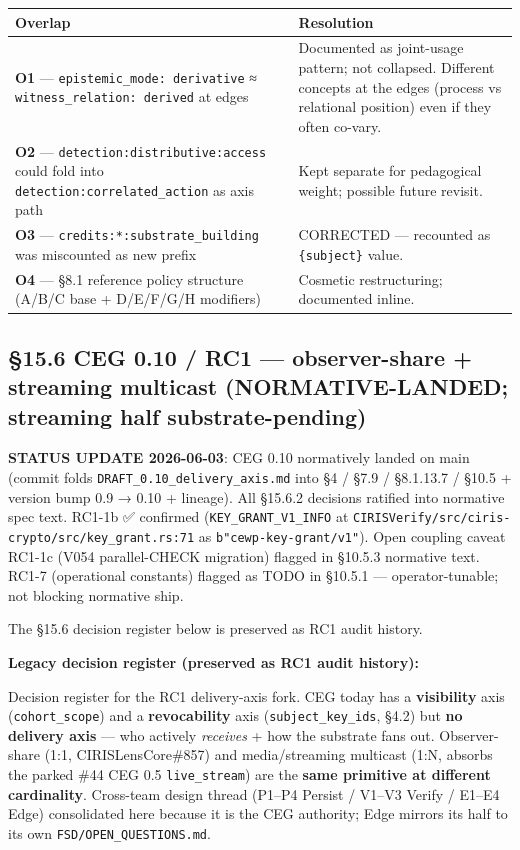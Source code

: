 \documentclass[10pt]{article}
\begin{document}
{\footnotesize
\begin{longtable}{|p{8.0cm}|p{8.0cm}|}\hline
\textbf{Overlap} & \textbf{Resolution} \\ \hline\endhead
\textbf{O1} — \texttt{epistemic\_mode: derivative} ≈ \texttt{witness\_relation: derived} at edges & Documented as joint-usage pattern; not collapsed. Different concepts at the edges (process vs relational position) even if they often co-vary. \\ \hline
\textbf{O2} — \texttt{detection:distributive:access} could fold into \texttt{detection:correlated\_action} as axis path & Kept separate for pedagogical weight; possible future revisit. \\ \hline
\textbf{O3} — \texttt{credits:*:substrate\_building} was miscounted as new prefix & CORRECTED — recounted as \texttt{\{subject\}} value. \\ \hline
\textbf{O4} — §8.1 reference policy structure (A/B/C base + D/E/F/G/H modifiers) & Cosmetic restructuring; documented inline. \\ \hline
\end{longtable}}


\subsection*{§15.6 CEG 0.10 / RC1 — observer-share + streaming multicast (NORMATIVE-LANDED; streaming half substrate-pending)}


\textbf{STATUS UPDATE 2026-06-03}: CEG 0.10 normatively landed on main (commit folds \texttt{DRAFT\_0.10\_delivery\_axis.md} into §4 / §7.9 / §8.1.13.7 / §10.5 + version bump 0.9 → 0.10 + lineage). All §15.6.2 decisions ratified into normative spec text. RC1-1b ✅ confirmed (\texttt{KEY\_GRANT\_V1\_INFO} at \texttt{CIRISVerify/src/ciris-crypto/src/key\_grant.rs:71} as \texttt{b"cewp-key-grant/v1"}). Open coupling caveat RC1-1c (V054 parallel-CHECK migration) flagged in §10.5.3 normative text. RC1-7 (operational constants) flagged as TODO in §10.5.1 — operator-tunable; not blocking normative ship.


The §15.6 decision register below is preserved as RC1 audit history.


\textbf{Legacy decision register (preserved as RC1 audit history):}


Decision register for the RC1 delivery-axis fork. CEG today has a \textbf{visibility} axis (\texttt{cohort\_scope}) and a \textbf{revocability} axis (\texttt{subject\_key\_ids}, §4.2) but \textbf{no delivery axis} — who actively \textit{receives} + how the substrate fans out. Observer-share (1:1, CIRISLensCore\#857) and media/streaming multicast (1:N, absorbs the parked \#44 CEG 0.5 \texttt{live\_stream}) are the \textbf{same primitive at different cardinality}. Cross-team design thread (P1–P4 Persist / V1–V3 Verify / E1–E4 Edge) consolidated here because it is the CEG authority; Edge mirrors its half to its own \texttt{FSD/OPEN\_QUESTIONS.md}.
\end{document}
